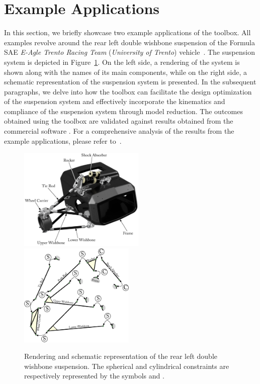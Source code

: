
\section{Example Applications}
\label{app4:sec:example_applications}

In this section, we briefly showcase two example applications of the \TrussMe{} toolbox. All examples revolve around the rear left double wishbone suspension of the Formula SAE \emph{E-Agle Trento Racing Team} (\emph{University of Trento}) vehicle~\citep{eagle}. The suspension system is depicted in Figure~\ref{app4:fig:suspension}. On the left side, a rendering of the system is shown along with the names of its main components, while on the right side, a schematic representation of the suspension system is presented. In the subsequent paragraphs, we delve into how the \TrussMe{} toolbox can facilitate the design optimization of the suspension system and effectively incorporate the kinematics and compliance of the suspension system through model reduction. The outcomes obtained using the \TrussMe{} toolbox are validated against results obtained from the commercial software \Ansys{}. For a comprehensive analysis of the results from the example applications, please refer to~\cite{larcher2024imece_symbolic}.

\begin{figure}[htb]
  \centering
  \includegraphics[width=6.0cm, trim={2cm 2cm 3.5cm 2cm}, clip]{./figures/appendix_4/rendering.eps}
  \includegraphics[width=5.5cm]{./figures/appendix_4/constraints.eps}
  \caption{Rendering and schematic representation of the rear left double wishbone suspension. The spherical and cylindrical constraints are respectively represented by the symbols  and .}
  \label{app4:fig:suspension}
\end{figure}

